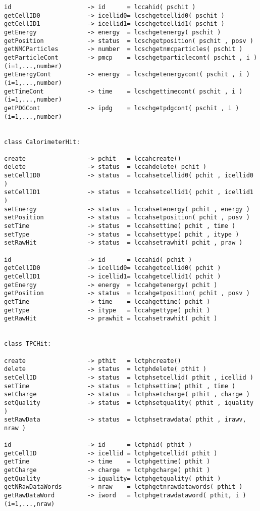 \begin{scriptsize}
\begin{verbatim}
id                     -> id      = lccahid( pschit )
getCellID0             -> icellid0= lcschgetcellid0( pschit )
getCellID1             -> icellid1= lcschgetcellid1( pschit )
getEnergy              -> energy  = lcschgetenergy( pschit )
getPosition            -> status  = lcschgetposition( pschit , posv )
getNMCParticles        -> number  = lcschgetnmcparticles( pschit )
getParticleCont        -> pmcp    = lcschgetparticlecont( pschit , i ) (i=1,...,number)
getEnergyCont          -> energy  = lcschgetenergycont( pschit , i )   (i=1,...,number)
getTimeCont            -> time    = lcschgettimecont( pschit , i )     (i=1,...,number)
getPDGCont             -> ipdg    = lcschgetpdgcont( pschit , i )      (i=1,...,number)


class CalorimeterHit:

create                 -> pchit   = lccahcreate()
delete                 -> status  = lccahdelete( pchit )
setCellID0             -> status  = lccahsetcellid0( pchit , icellid0 )
setCellID1             -> status  = lccahsetcellid1( pchit , icellid1 )
setEnergy              -> status  = lccahsetenergy( pchit , energy )
setPosition            -> status  = lccahsetposition( pchit , posv )
setTime                -> status  = lccahsettime( pchit , time )
setType                -> status  = lccahsettype( pchit , itype )
setRawHit              -> status  = lccahsetrawhit( pchit , praw )

id                     -> id      = lccahid( pchit )
getCellID0             -> icellid0= lccahgetcellid0( pchit )
getCellID1             -> icellid1= lccahgetcellid1( pchit )
getEnergy              -> energy  = lccahgetenergy( pchit )
getPosition            -> status  = lccahgetposition( pchit , posv )
getTime                -> time    = lccahgettime( pchit )
getType                -> itype   = lccahgettype( pchit )
getRawHit              -> prawhit = lccahsetrawhit( pchit )


class TPCHit:

create                 -> pthit   = lctphcreate()
delete                 -> status  = lctphdelete( pthit )
setCellID              -> status  = lctphsetcellid( pthit , icellid )
setTime                -> status  = lctphsettime( pthit , time )
setCharge              -> status  = lctphsetcharge( pthit , charge )
setQuality             -> status  = lctphsetquality( pthit , iquality )
setRawData             -> status  = lctphsetrawdata( pthit , irawv, nraw )

id                     -> id      = lctphid( pthit )
getCellID              -> icellid = lctphgetcellid( pthit )
getTime                -> time    = lctphgettime( pthit )
getCharge              -> charge  = lctphgcharge( pthit )
getQuality             -> iquality= lctphgetquality( pthit )
getNRawDataWords       -> nraw    = lctphgetnrawdatawords( pthit )
getRawDataWord         -> iword   = lctphgetrawdataword( pthit, i )  (i=1,...,nraw)



\end{verbatim}
\end{scriptsize}
